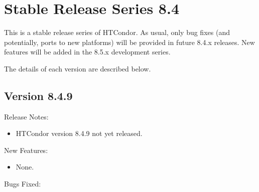 
\section{\label{sec:History-8-4}Stable Release Series 8.4}

This is a stable release series of HTCondor.
As usual, only bug fixes (and potentially, ports to new platforms)
will be provided in future 8.4.x releases.
New features will be added in the 8.5.x development series.

The details of each version are described below.

\subsection*{\label{sec:New-8-4-9}Version 8.4.9}

\noindent Release Notes:

\begin{itemize}

\item HTCondor version 8.4.9 not yet released.

\end{itemize}


\noindent New Features:

\begin{itemize}

\item None.

\end{itemize}

\noindent Bugs Fixed:

